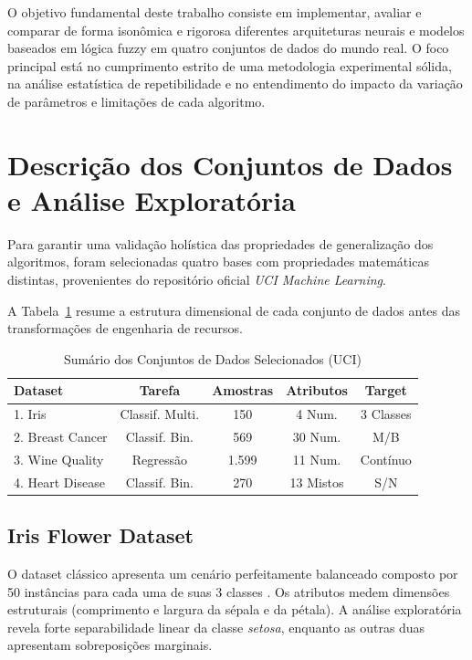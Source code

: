 \documentclass[10pt, journal, compsoc]{IEEEtran}
\begin{document}
O objetivo fundamental deste trabalho consiste em implementar, avaliar e comparar de forma isonômica e rigorosa diferentes arquiteturas neurais e modelos baseados em lógica fuzzy em quatro conjuntos de dados do mundo real. O foco principal está no cumprimento estrito de uma metodologia experimental sólida, na análise estatística de repetibilidade e no entendimento do impacto da variação de parâmetros e limitações de cada algoritmo.

\section{Descrição dos Conjuntos de Dados e Análise Exploratória}
Para garantir uma validação holística das propriedades de generalização dos algoritmos, foram selecionadas quatro bases com propriedades matemáticas distintas, provenientes do repositório oficial \textit{UCI Machine Learning}.

A Tabela~\ref{tab:datasets} resume a estrutura dimensional de cada conjunto de dados antes das transformações de engenharia de recursos.

\begin{table}[htbp]
\caption{Sumário dos Conjuntos de Dados Selecionados (UCI)}
\label{tab:datasets}
\centering
\begin{tabular}{lcccc}
\toprule
\textbf{Dataset} & \textbf{Tarefa} & \textbf{Amostras} & \textbf{Atributos} & \textbf{Target} \\
\midrule
1. Iris & Classif. Multi. & 150 & 4 Num. & 3 Classes \\
2. Breast Cancer & Classif. Bin. & 569 & 30 Num. & M/B \\
3. Wine Quality & Regressão & 1.599 & 11 Num. & Contínuo \\
4. Heart Disease & Classif. Bin. & 270 & 13 Mistos & S/N \\
\bottomrule
\end{tabular}
\end{table}

\subsection{Iris Flower Dataset}
O dataset clássico apresenta um cenário perfeitamente balanceado composto por 50 instâncias para cada uma de suas 3 classes \cite{iris_53}. Os atributos medem dimensões estruturais (comprimento e largura da sépala e da pétala). A análise exploratória revela forte separabilidade linear da classe \textit{setosa}, enquanto as outras duas apresentam sobreposições marginais.
\end{document}
